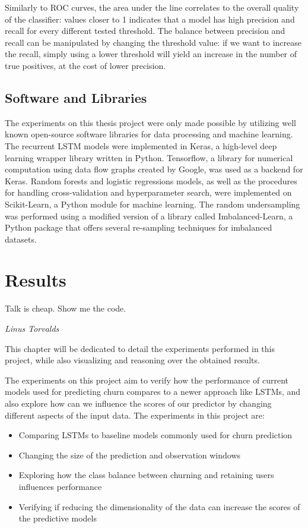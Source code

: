 \documentclass{kththesis}
\begin{document}
Similarly to ROC curves, the area under the line correlates to the overall quality of the classifier: values closer to 1 indicates that a model has high precision and recall for every different tested threshold.  The balance between precision and recall can be manipulated by changing the threshold value: if we want to increase the recall, simply using a lower threshold will yield an increase in the number of true positives, at the cost of lower precision.

\section{Software and Libraries}

The experiments on this thesis project were only made possible by utilizing well known open-source software libraries for data processing and machine learning. The recurrent LSTM models were implemented in Keras\citep{chollet2015keras}, a high-level deep learning wrapper library written in Python.  Tensorflow\citep{abadi2016tensorflow}, a library for numerical computation using data flow graphs created by Google, was used as a backend for Keras. Random forests and logistic regressions models, as well as  the procedures for handling cross-validation and hyperparameter search, were implemented on Scikit-Learn\citep{scikit-learn}, a Python module for machine learning. The random undersampling was performed using a modified version of a library called Imbalanced-Learn\citep{lema2017imbalanced}, a Python package that offers several re-sampling techniques for imbalanced datasets. 

\chapter{Results}
\label{cha:results}

\epigraph{Talk is cheap. Show me the code.}{\textit{Linus Torvalds}}

This chapter will be dedicated to detail the experiments performed in this project, while also visualizing and reasoning over the obtained results.

The experiments on this project aim to verify how the performance of current models used for predicting churn compares to a newer approach like LSTMs, and also explore how can we influence the scores of our predictor by changing different aspects of the input data. The experiments in this project are:

\begin{itemize}
\item Comparing LSTMs to baseline models commonly used for churn prediction
\item Changing the size of the prediction and observation windows
\item Exploring how the class balance between churning and retaining users influences performance
\item Verifying if reducing the dimensionality of the data can increase the scores of the predictive models 
\end{itemize}
\end{document}
